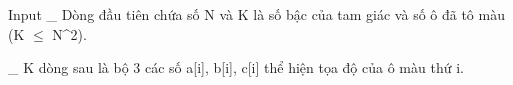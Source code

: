 Input
\_ Dòng đầu tiên chứa số N và K là số bậc của tam giác và số ô đã tô màu (K  $\le$  N^2).  

   \_ K dòng sau là bộ 3 các số a[i], b[i], c[i] thể hiện tọa độ của ô màu thứ i.